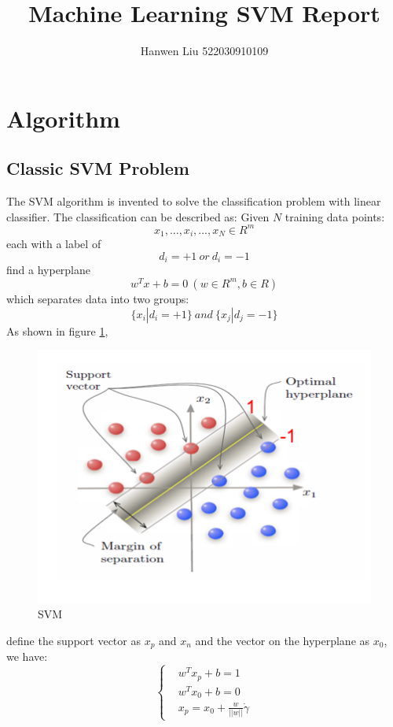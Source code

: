 \documentclass[twocolumn, a4paper]{article}
\title{\bf{Machine Learning SVM Report}}
\author{Hanwen Liu 522030910109}
\begin{document}
\maketitle
\section{Algorithm}

\subsection{Classic SVM Problem}
The SVM algorithm is invented to solve the classification problem with linear classifier. The classification can be described as: Given $N$ training data points:
\begin{equation}
\nonumber
  x_1,...,x_i,...,x_N \in R^m
\end{equation}
each with a label of
\begin{equation}
\nonumber
  d_i=+1\ or\ d_i=-1
\end{equation}
find a hyperplane
\begin{equation}
\nonumber
  w^Tx+b=0\ (w\in R^m, b\in R)
\end{equation}
which separates data into two groups:
\begin{equation}
\nonumber
  \{x_i|d_i=+1\}\ and\ \{x_j|d_j=-1\}
\end{equation}
As shown in figure \ref{fig:SVM},
\begin{figure}[htb]
  \centering
  \includegraphics{SVMpng.png}
  \caption{SVM}
  \label{fig:SVM}
\end{figure}define the support vector as $x_p$ and $x_n$ and the vector on the hyperplane as $x_0$, we have:\begin{equation}
\left\{
\begin{aligned}
\nonumber
&w^Tx_p+b=1\\
&w^Tx_0+b=0\\
&x_p=x_0+\frac{w}{||w||}\dot \gamma
\end{aligned}
\right.
\end{equation}
\end{document}
